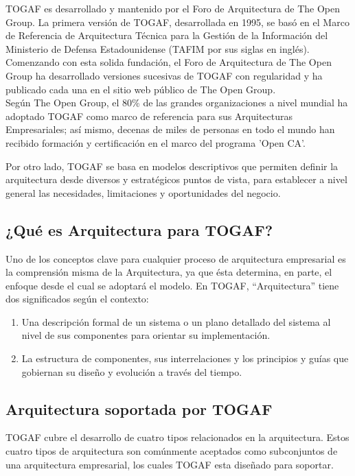 TOGAF es desarrollado y mantenido por el Foro de Arquitectura de The Open Group. La primera versión de TOGAF, desarrollada en 1995, se basó en el Marco de Referencia de Arquitectura Técnica para la Gestión de la Información del Ministerio de Defensa Estadounidense (TAFIM por sus siglas en inglés). Comenzando con esta solida fundación, el Foro de Arquitectura de The Open Group ha desarrollado versiones sucesivas de TOGAF con regularidad y ha publicado cada una en el sitio web público de The Open Group. \cite{ref4} \\

Según The Open Group, el 80\% de las grandes organizaciones a nivel mundial ha adoptado TOGAF como marco de referencia para sus Arquitecturas Empresariales; así mismo, decenas de miles de personas en todo el mundo han recibido formación y certificación en el marco del programa 'Open CA'.

Por otro lado, TOGAF se basa en modelos descriptivos que permiten definir la arquitectura desde diversos y estratégicos puntos de vista, para establecer a nivel general las necesidades, limitaciones y oportunidades del negocio.

  \subsection{¿Qué es Arquitectura para TOGAF?}
  Uno de los conceptos clave para cualquier proceso de arquitectura empresarial es la comprensión misma de la Arquitectura, ya que ésta determina, en parte, el enfoque desde el cual se adoptará el modelo. En TOGAF, “Arquitectura” tiene dos significados según el contexto:
  \begin{enumerate}
  	\item Una descripción formal de un sistema o un plano detallado del sistema al nivel de sus componentes para orientar su implementación. \cite{ref4}
  	\item La estructura de componentes, sus interrelaciones y los principios y guías que gobiernan su diseño y evolución a través del tiempo.  \cite{ref4}
  \end{enumerate}
  
  \subsection{Arquitectura soportada por TOGAF}
  TOGAF cubre el desarrollo de cuatro tipos relacionados en la arquitectura. Estos cuatro tipos de arquitectura son comúnmente aceptados como subconjuntos de una arquitectura empresarial, los cuales TOGAF esta diseñado para soportar.
  
